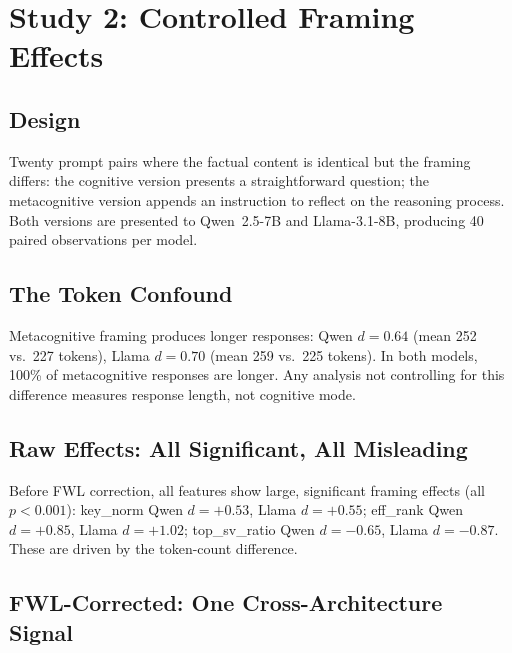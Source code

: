 \documentclass[11pt,a4paper]{article}
\begin{document}
\section{Study 2: Controlled Framing Effects}

\subsection{Design}

Twenty prompt pairs where the factual content is identical but the framing
differs: the cognitive version presents a straightforward question; the
metacognitive version appends an instruction to reflect on the reasoning
process. Both versions are presented to Qwen~2.5-7B and Llama-3.1-8B,
producing 40 paired observations per model.

\subsection{The Token Confound}

Metacognitive framing produces longer responses: Qwen $d = 0.64$ (mean 252
vs.\ 227 tokens), Llama $d = 0.70$ (mean 259 vs.\ 225 tokens). In both
models, 100\% of metacognitive responses are longer. Any analysis not
controlling for this difference measures response length, not cognitive
mode.

\subsection{Raw Effects: All Significant, All Misleading}

Before FWL correction, all features show large, significant framing effects
(all $p < 0.001$): key\_norm Qwen $d = +0.53$, Llama $d = +0.55$;
eff\_rank Qwen $d = +0.85$, Llama $d = +1.02$; top\_sv\_ratio Qwen
$d = -0.65$, Llama $d = -0.87$. These are driven by the token-count
difference.

\subsection{FWL-Corrected: One Cross-Architecture Signal}
\end{document}
